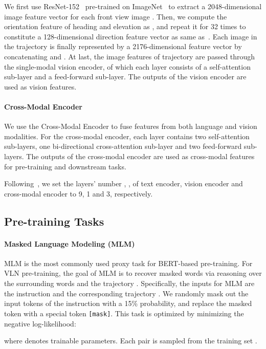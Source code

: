 \documentclass[10pt,twocolumn,letterpaper]{article}
\begin{document}
We first use ResNet-152~\cite{resnet} pre-trained on ImageNet~\cite{imagenet} to extract a 2048-dimensional image feature vector  for each front view image . 
Then, we compute the orientation feature of heading  and elevation  as , and repeat it for 32 times to constitute a 128-dimensional direction feature vector  as same as~\cite{envdrop}.
Each image  in the trajectory is finally represented by a 2176-dimensional feature vector  by concatenating  and . 
At last, the image features of trajectory  are passed through the single-modal vision encoder, of which each layer consists of a self-attention sub-layer and a feed-forward sub-layer. The outputs of the vision encoder are used as vision features.

\vspace{-8pt}
\paragraph{Cross-Modal Encoder}
We use the Cross-Modal Encoder to fuse features from both language and vision modalities. 
For the cross-modal encoder, each layer contains two self-attention sub-layers, one bi-directional cross-attention sub-layer and two feed-forward sub-layers. 
The outputs of the cross-modal encoder are used as cross-modal features for pre-training and downstream tasks.

Following~\cite{prevalent}, we set the layers' number , ,  of text encoder, vision encoder and cross-modal encoder to 9, 1 and 3, respectively. 

\subsection{Pre-training Tasks}
\paragraph{Masked Language Modeling (MLM)} 
MLM is the most commonly used proxy task for BERT-based pre-training. For VLN pre-training, the goal of MLM is to recover masked words  via reasoning over the surrounding words  and the trajectory .
Specifically, the inputs for MLM are the instruction  and the corresponding trajectory . 
We randomly mask out the input tokens of the instruction with a 15\% probability, and replace the masked token  with a special token \texttt{[mask]}.
This task is optimized by minimizing the negative log-likelihood:

where  denotes trainable parameters. 
Each pair  is sampled from the training set .
\end{document}
